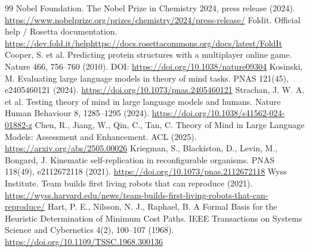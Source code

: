 \begin{thebibliography}{99}
 Nobel Foundation. The Nobel Prize in Chemistry 2024, press release (2024). \url{https://www.nobelprize.org/prizes/chemistry/2024/press-release/}
 Foldit. Official help / Rosetta documentation. \url{https://dev.fold.it/help}\quad\url{https://docs.rosettacommons.org/docs/latest/FoldIt}
 Cooper, S. et al. Predicting protein structures with a multiplayer online game. Nature 466, 756--760 (2010). DOI: \url{https://doi.org/10.1038/nature09304}
 Kosinski, M. Evaluating large language models in theory of mind tasks. PNAS 121(45), e2405460121 (2024). \url{https://doi.org/10.1073/pnas.2405460121}
 Strachan, J. W. A. et al. Testing theory of mind in large language models and humans. Nature Human Behaviour 8, 1285--1295 (2024). \url{https://doi.org/10.1038/s41562-024-01882-z}
 Chen, R., Jiang, W., Qin, C., Tan, C. Theory of Mind in Large Language Models: Assessment and Enhancement. ACL (2025). \url{https://arxiv.org/abs/2505.00026}
 Kriegman, S., Blackiston, D., Levin, M., Bongard, J. Kinematic self-replication in reconfigurable organisms. PNAS 118(49), e2112672118 (2021). \url{https://doi.org/10.1073/pnas.2112672118}
 Wyss Institute. Team builds first living robots that can reproduce (2021). \url{https://wyss.harvard.edu/news/team-builds-first-living-robots-that-can-reproduce/}
 Hart, P. E., Nilsson, N. J., Raphael, B. A Formal Basis for the Heuristic Determination of Minimum Cost Paths. IEEE Transactions on Systems Science and Cybernetics 4(2), 100--107 (1968). \url{https://doi.org/10.1109/TSSC.1968.300136}
\end{thebibliography}
